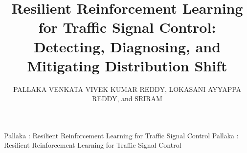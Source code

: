 \documentclass{ieeeaccess}
\begin{document}

\title{Resilient Reinforcement Learning for Traffic Signal Control: Detecting, Diagnosing, and Mitigating Distribution Shift}

\author{\uppercase{Pallaka Venkata Vivek Kumar Reddy},
\uppercase{Lokasani Ayyappa Reddy}, and
\uppercase{Sriram}}

\address[1]{Pallaka Venkata Vivek Kumar Reddy (e-mail: vivekreddypallaka1@gmail.com)}
\address[2]{Lokasani Ayyappa Reddy (e-mail: ayyappareddy253@gmail.com)}
\address[3]{Sriram (e-mail: sriramallamraj@gmail.com)}
\address{All authors are with the Department of Computer Science with Artificial Intelligence, Amrita Vishwa Vidyapeetham, Amritapuri Campus, Kollam, Kerala 690525, India.}


\markboth
{Pallaka \headeretal: Resilient Reinforcement Learning for Traffic Signal Control}
{Pallaka \headeretal: Resilient Reinforcement Learning for Traffic Signal Control}

\end{document}
